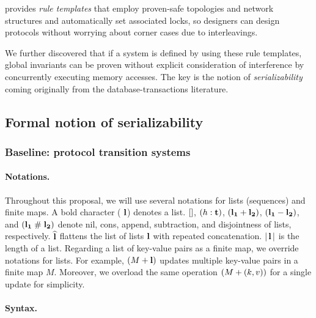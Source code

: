 \hemiola{} provides \emph{rule templates} that employ proven-safe topologies and network structures and automatically set associated locks, so designers can design protocols without worrying about corner cases due to interleavings.

We further discovered that if a system is defined by using these rule templates, global invariants can be proven without explicit consideration of interference by concurrently executing memory accesses.
The key is the notion of \emph{serializability} coming originally from the database-transactions literature.

\subsection{Formal notion of serializability}

\subsubsection{Baseline: protocol transition systems}
\label{sec-trs}

\paragraph{Notations.}
Throughout this proposal, we will use several notations for lists (sequences) and finite maps.
A bold character (\eg{} $\mathbf{l}$) denotes a list.
$\lbrack\rbrack{}$, $(h : \mathbf{t})$, $(\mathbf{l_1} + \mathbf{l_2})$, $(\mathbf{l_1} - \mathbf{l_2})$, and
$(\mathbf{l_1} \; \# \; \mathbf{l_2})$ denote nil, cons, append, subtraction, and disjointness of lists, respectively.
$\widehat{\mathbf{l}}$ flattens the list of lists $\mathbf{l}$ with repeated concatenation.
$|\, \mathbf{l}\, |$ is the length of a list.
Regarding a list of key-value pairs as a finite map, we override notations for lists.
For example, $(M + \mathbf{l})$ updates multiple key-value pairs in a finite map $M$.
Moreover, we overload the same operation $(M + (k, v))$ for a single update for simplicity.

\paragraph{Syntax.}

